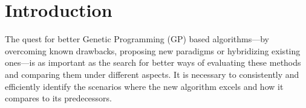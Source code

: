 \section{Introduction}

The quest for better Genetic Programming (GP) based algorithms---by overcoming known drawbacks, proposing new paradigms or hybridizing existing ones---is as important as the search for better ways of evaluating these methods and comparing them under different aspects. It is necessary to consistently and efficiently identify the scenarios where the new algorithm excels and how it compares to its predecessors.